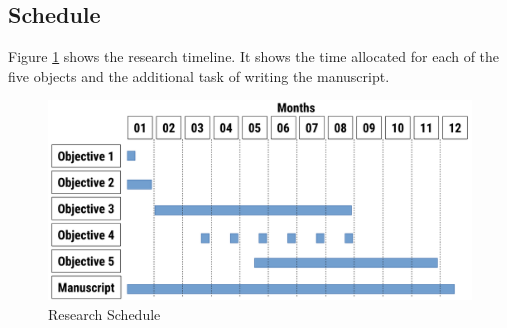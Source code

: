 \documentclass{article}
\begin{document}
\subsection{Schedule}

Figure \ref{fig:schedule} shows the research timeline. It shows the time allocated for each of the
five objects and the additional task of writing the manuscript.

\begin{figure}[H]
\begin{center}
\includegraphics[scale=0.80]{figures/zzz-schedule.pdf}
\caption{Research Schedule}
\label{fig:schedule}
\end{center}
\end{figure}


\newpage

\end{document}

